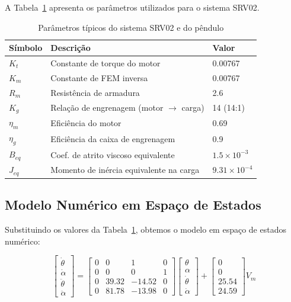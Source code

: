 \documentclass[9pt,a4paper,twocolumn,twoside]{tau-class/tau}
\begin{document}
A Tabela~\ref{tab:parametros} apresenta os parâmetros utilizados para o sistema SRV02.

\begin{table}[H]
\centering
\caption{Parâmetros típicos do sistema SRV02 e do pêndulo}
\label{tab:parametros}
\begin{tabular}{lll}
\toprule
\textbf{Símbolo} & \textbf{Descrição} & \textbf{Valor} \\
\midrule
$K_t$   & Constante de torque do motor            & 0.00767 \\
$K_m$   & Constante de FEM inversa                & 0.00767 \\
$R_m$   & Resistência de armadura                 & 2.6 \\
$K_g$   & Relação de engrenagem (motor $\rightarrow$ carga) & 14 (14:1) \\
$\eta_m$ & Eficiência do motor                    & 0.69 \\
$\eta_g$ & Eficiência da caixa de engrenagem      & 0.9 \\
$B_{eq}$ & Coef. de atrito viscoso equivalente    & $1.5 \times 10^{-3}$ \\
$J_{eq}$ & Momento de inércia equivalente na carga & $9.31 \times 10^{-4}$ \\
\bottomrule
\end{tabular}
\end{table}

\subsection{Modelo Numérico em Espaço de Estados}

Substituindo os valores da Tabela~\ref{tab:parametros}, obtemos o modelo em espaço de estados numérico:

\begin{equation}
\begin{bmatrix}
\dot{\theta} \\
\dot{\alpha} \\
\ddot{\theta} \\
\ddot{\alpha}
\end{bmatrix}
=
\begin{bmatrix}
0 & 0 & 1 & 0 \\
0 & 0 & 0 & 1 \\
0 & 39.32 & -14.52 & 0 \\
0 & 81.78 & -13.98 & 0
\end{bmatrix}
\begin{bmatrix}
\theta \\ \alpha \\ \dot{\theta} \\ \dot{\alpha}
\end{bmatrix}
+
\begin{bmatrix}
0 \\ 0 \\ 25.54 \\ 24.59
\end{bmatrix} V_m
\label{eq:estadoNum}
\end{equation}
\end{document}
